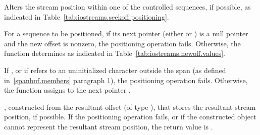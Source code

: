\documentclass[ebook,11pt,article]{memoir}
\begin{document}
\begin{itemdescr}
\pnum
\effects
Alters the stream position within one of the
controlled sequences, if possible, as indicated in Table~\ref{tab:iostreams.seekoff.positioning}.


\pnum
For a sequence to be positioned, if its next pointer
(either
or
)
is a null pointer and the new offset  is nonzero, the positioning
operation fails. Otherwise, the function determines  as indicated in
Table~\ref{tab:iostreams.newoff.values}.


\pnum
If
,
or if  refers to an uninitialized
character outside the span (as defined in~\ref{spanbuf.members} paragraph 1),
the positioning operation fails.
Otherwise, the function assigns
to the next pointer .

\pnum
\returns
{},
constructed from the resultant offset 
(of type
),
that stores the resultant stream position, if possible.
If the positioning operation fails, or
if the constructed object cannot represent the resultant stream position,
the return value is
.
\end{itemdescr}
\end{document}
